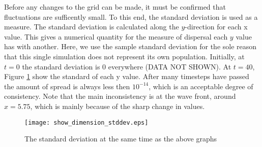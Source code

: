Before any changes to the grid can be made, it must be confirmed that fluctuations are sufficently small.
To this end, the standard deviation is used as a measure.
The standard deviation is calculated along the $y$-direction for each x value.
This gives a numerical quantity for the measure of dispersal each $y$ value has with another.
Here, we use the sample standard deviation for the sole reason that this single simulation does not represent its own population.
Initially, at $t =0$ the standard deviation is 0 everywhere (DATA NOT SHOWN).
At $t = 40$, Figure \ref{fig:show_dimension_stddev} show the standard of each y value.
After many timesteps have passed the amount of spread is always less then $10^{-14}$, which is an acceptable degree of consistency.
Note that the main inconsistency is at the wave front, around $x = 5.75$, which is mainly because of the sharp change in values.

\begin{figure}[h!bt]
  \centering
  \texttt{[image: show\_dimension\_stddev.eps]}
  \caption{The standard deviation at the same time as the above graphs}
  \label{fig:show_dimension_stddev}
\end{figure}



